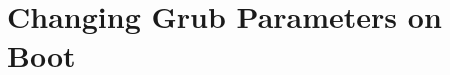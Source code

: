
\usepackage{minted}
\usepackage{booktabs}


	
	
	\section{Changing Grub Parameters on Boot}
		 



